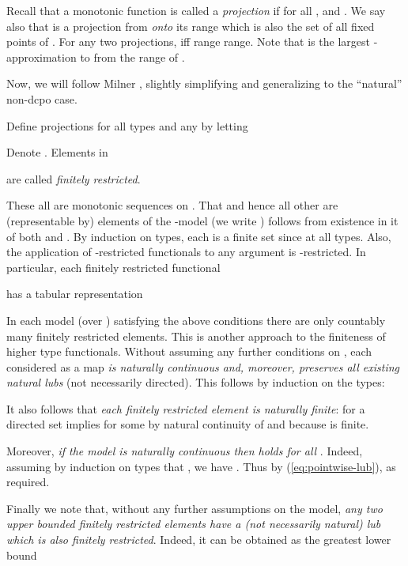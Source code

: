\documentclass[fleqn]{LMCS}
\theoremstyle{plain}\newtheorem{satz}[thm]{Satz}
\theoremstyle{plain}\newtheorem{hyp}[thm]{Hypothesis}
\theoremstyle{plain}\newtheorem{hyps}[thm]{Hypotheses}
\theoremstyle{definition}\newtheorem{note}[thm]{Note}
\newcommand{\?}{\mbox{?}}
\begin{document}
\bigskip

Recall that a monotonic function  
is called a \emph{projection} 
if  for all , and  . 
We say also that  is a projection from  \emph{onto} its range  
which is also the set of all fixed points of . 
For any two projections,  iff 
range  range. 
Note that 
 is the largest -approximation to  
from the range of . 




\bigskip

\noindent
Now, we will follow Milner \cite{Milner77}, 
slightly simplifying and generalizing to the ``natural'' non-dcpo case. 

\begin{defi}\label{def:proj-finitely-restricted}Define projections 
 for all types and any  
by letting

Denote . 
Elements  in 
 
are called \emph{finitely restricted}. 
\end{defi}
\noindent
These all are monotonic sequences on . 
That  and hence all other  are 
(representable by) elements of the -model 
(we write )
follows from existence in it of both  and . 
By induction on types, each  is a finite set 
since  at all types. 
Also, the application of -restricted functionals to any argument is -restricted. 
In particular, each finitely restricted functional  
 
has a tabular representation

In each model  (over ) 
satisfying the above conditions 
there are only countably many finitely restricted elements. 
This is another approach to the finiteness 
of higher type functionals.
Without assuming any further conditions on , 
each  considered as a map 
\mbox{} 
\emph{is naturally continuous and, moreover, 
preserves all existing natural  lubs} (not necessarily directed). 
This follows by induction on the types: 

It also follows that \emph{each finitely restricted element 
 is naturally finite}: 
 for a directed set  
implies  
for some  by natural  continuity of  
and because  is finite. 

Moreover, \emph{if the model is naturally continuous then
 holds for all }. 
Indeed, assuming by induction on types that , 
we have
. 
Thus  by (\ref{eq:pointwise-lub}), as required. 

Finally we note that, without any further assumptions on the model, 
\emph{any two upper bounded finitely restricted elements  
have a (not necessarily natural) lub  which is also finitely restricted}. 
Indeed, it can be obtained as the greatest lower bound 
 
\end{document}
